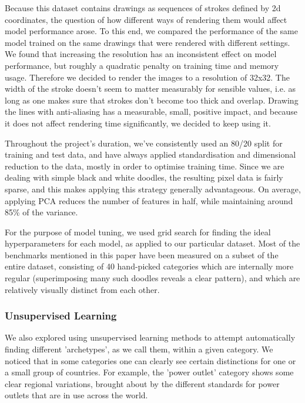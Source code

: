 \documentclass[a4paper, twocolumn]{article}
\begin{document}
Because this dataset contains drawings as sequences of strokes defined by 2d coordinates, the question of how different ways of rendering them would affect model performance arose. To this end, we compared the performance of the same model trained on the same drawings that were rendered with different settings. We found that increasing the resolution has an inconsistent effect on model performance, but roughly a quadratic penalty on training time and memory usage. Therefore we decided to render the images to a resolution of 32x32. The width of the stroke doesn't seem to matter measurably for sensible values, i.e. as long as one makes sure that strokes don't become too thick and overlap. Drawing the lines with anti-aliasing has a measurable, small, positive impact, and because it does not affect rendering time significantly, we decided to keep using it.

Throughout the project's duration, we've consistently used an 80/20 split for training and test data, and have always applied standardisation and dimensional reduction to the data, mostly in order to optimise training time. Since we are dealing with simple black and white doodles, the resulting pixel data is fairly sparse, and this makes applying this strategy generally advantageous. On average, applying PCA reduces the number of features in half, while maintaining around 85\% of the variance.

For the purpose of model tuning, we used grid search for finding the ideal hyperparameters for each model, as applied to our particular dataset. Most of the benchmarks mentioned in this paper have been measured on a subset of the entire dataset, consisting of 40 hand-picked categories which are internally more regular (superimposing many such doodles reveals a clear pattern), and which are relatively visually distinct from each other.

\subsubsection{Unsupervised Learning\label{sec:Unsupervised Learning}}
We also explored using unsupervised learning methods to attempt automatically finding different 'archetypes', as we call them, within a given category. We noticed that in some categories one can clearly see certain distinctions for one or a small group of countries. For example, the 'power outlet' category shows some clear regional variations, brought about by the different standards for power outlets that are in use across the world.
\end{document}
